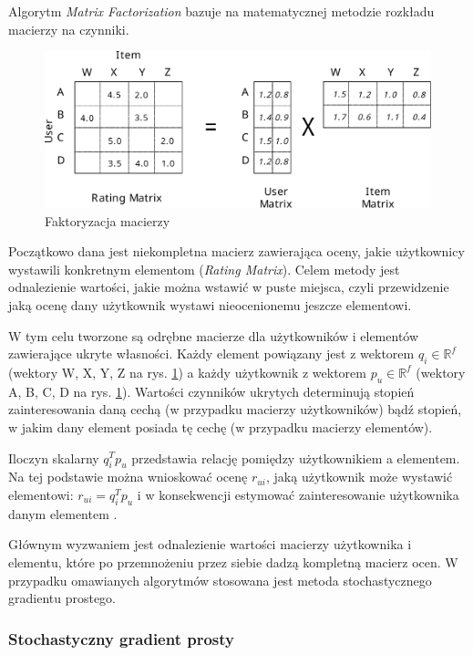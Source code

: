 \documentclass[twoside]{iisthesis}
\begin{document}
	 Algorytm \textit{Matrix Factorization} bazuje na matematycznej metodzie rozkładu macierzy na czynniki.
	 
	 
	 \begin{figure}[!ht] 
	 	\centering
	 	\includegraphics[width=1\textwidth]{factorization}
	 	\caption{Faktoryzacja macierzy \protect\cite{id:ComputingRecommendationsExtremeScaleApacheFlink}}
	 	\label{fig:factorization}
	 \end{figure}
	 
	 Początkowo dana jest niekompletna macierz zawierająca oceny, jakie użytkownicy wystawili konkretnym elementom (\textit{Rating Matrix}). Celem metody jest odnalezienie wartości, jakie można wstawić w puste miejsca, czyli przewidzenie jaką ocenę dany użytkownik wystawi nieocenionemu jeszcze elementowi. 		
	 
	 W tym celu tworzone są odrębne macierze dla użytkowników i elementów zawierające ukryte własności. Każdy element powiązany jest z wektorem $q_i \in \mathbb{R} ^f$ (wektory W, X, Y, Z na rys. \ref{fig:factorization}) a każdy użytkownik z wektorem $p_u \in \mathbb{R} ^f$ (wektory A, B, C, D na rys. \ref{fig:factorization}). Wartości czynników ukrytych determinują stopień zainteresowania daną cechą (w przypadku macierzy użytkowników) bądź stopień, w jakim dany element posiada tę cechę (w przypadku macierzy elementów).		
	 
	 Iloczyn skalarny $q_i^T p_u$ przedstawia relację pomiędzy użytkownikiem a elementem. Na tej podstawie można wnioskować ocenę $r_{ui}$, jaką użytkownik może wystawić elementowi: $r_{ui} = q_i^T p_u$ i w konsekwencji estymować zainteresowanie użytkownika danym elementem \cite{koren2009matrix}.
	 
	 Głównym wyzwaniem jest odnalezienie wartości macierzy użytkownika i elementu, które po przemnożeniu przez siebie dadzą kompletną macierz ocen. W przypadku omawianych algorytmów stosowana jest metoda stochastycznego gradientu prostego. 
	 
	 \subsubsection{Stochastyczny gradient prosty}
	 
\end{document}
